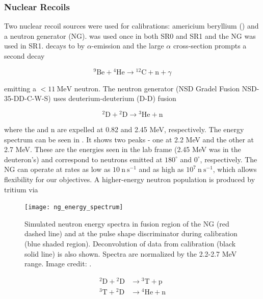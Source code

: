 \subsubsection{Nuclear Recoils}
\label{subsubsec:er_nr_calibrations_parameter_determ_nr}
Two nuclear recoil sources were used for calibrations: americium beryllium () and a neutron generator
(NG).  \ambe was used once in both SR0 and SR1 and the NG was used in SR1.  \ambe decays to  by $\alpha$-emission and
the large  $\alpha$ cross-section prompts a second decay

\begin{equation}
\mathrm{^{9}Be} + \mathrm{^{4}He} \rightarrow \mathrm{^{12}C + n} + \gamma
\end{equation}

\noindent emitting a $< 11\ \mathrm{MeV}$ neutron.  The neutron generator (NSD Gradel Fusion NSD-35-DD-C-W-S) uses
deuterium-deuterium (D-D) fusion

\begin{equation}
\mathrm{^{2}D} + \mathrm{^{2}D} \rightarrow \mathrm{^{3}He} + \mathrm{n}
\end{equation}

\noindent where the  and n are expelled at 0.82 and 2.45 MeV, respectively.  The energy spectrum can be seen in
.  It shows two peaks - one at 2.2 MeV and the other at 2.7 MeV.  These
are the energies seen in the lab frame (2.45 MeV was in the deuteron's) and correspond to neutrons emitted at $180^{\circ}$ and
$0^{\circ}$, respectively.  The NG can operate at rates as low as $10\ \mathrm{n\ s^{-1}}$
and as high as $10^7\ \mathrm{n\ s^{-1}}$, which allows flexibility for our objectives.  A higher-energy neutron
population is produced by tritium via

\begin{figure}
\centering
\texttt{[image: ng\_energy\_spectrum]}
\caption{Simulated neutron energy spectra in fusion region of the NG (red dashed line) and at the pulse shape discriminator during
calibration (blue shaded region).  Deconvolution of data from calibration (black solid line) is also shown.  Spectra are normalized by
the 2.2-2.7 MeV range.  Image credit: .}
\label{fig:er_nr_calibrations_parameter_determ_nr_ng_energy}
\end{figure}

\begin{equation}
\begin{aligned}
\mathrm{^{2}D} + \mathrm{^{2}D} &\rightarrow \mathrm{^{3}T} + \mathrm{p} \\
\mathrm{^{3}T} + \mathrm{^{2}D} &\rightarrow \mathrm{^{4}He} + \mathrm{n}
\end{aligned}
\end{equation}

